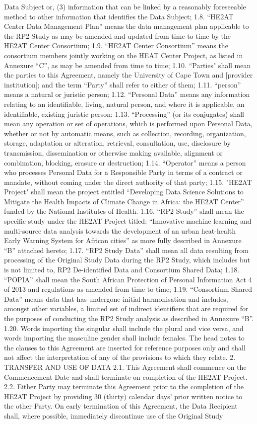 \documentclass[12pt,letterpaper]{article}
\begin{document}
Data Subject or, (3) information that can be linked by a reasonably foreseeable method to other information that identifies the Data Subject;   1.8.	“HE2AT Center Data Management Plan” means the data management plan applicable to the RP2 Study as may be amended and updated from time to time by the HE2AT Center Consortium; 1.9.	“HE2AT Center Consortium” means the consortium members jointly working on the HEAT Center Project, as listed in Annexure “C”, as may be amended from time to time; 1.10.	“Parties" shall mean the parties to this Agreement, namely the University of Cape Town and [provider institution]; and the term “Party” shall refer to either of them; 1.11.	“person” means a natural or juristic person; 1.12.	“Personal Data” means any information relating to an identifiable, living, natural person, and where it is applicable, an identifiable, existing juristic person;	 1.13.	“Processing” (or its conjugates) shall mean any operation or set of operations, which is performed upon Personal Data, whether or not by automatic means, such as collection, recording, organization, storage, adaptation or alteration, retrieval, consultation, use, disclosure by transmission, dissemination or otherwise making available, alignment or combination, blocking, erasure or destruction; 1.14.	“Operator” means a person who processes Personal Data for a Responsible Party in terms of a contract or mandate, without coming under the direct authority of that party; 1.15.	"HE2AT Project" shall mean the project entitled “Developing Data Science Solutions to Mitigate the Health Impacts of Climate Change in Africa: the HE2AT Center” funded by the National Institutes of Health. 1.16.	“RP2 Study” shall mean the specific study under the HE2AT Project titled: “Innovative machine learning and multi-source data analysis towards the development of an urban heat-health Early Warning System for African cities” as more fully described in Annexure “B” attached hereto; 1.17.	“RP2 Study Data” shall mean all data resulting from processing of the Original Study Data during the RP2 Study, which includes but is not limited to, RP2 De-identified Data and Consortium Shared Data; 1.18.	“POPIA” shall mean the South African Protection of Personal Information Act 4 of 2013 and regulations as amended from time to time; 1.19.	“Consortium Shared Data” means data that has undergone initial harmonisation and includes, amongst other variables, a limited set of indirect identifiers that are required for the purposes of conducting the RP2 Study analysis as described in Annexure “B”.  1.20.	Words importing the singular shall include the plural and vice versa, and words importing the masculine gender shall include females. The head notes to the clauses to this Agreement are inserted for reference purposes only and shall not affect the interpretation of any of the provisions to which they relate. 2.	TRANSFER AND USE OF DATA 2.1.	This Agreement shall commence on the Commencement Date and shall terminate on completion of the HE2AT Project. 2.2.	Either Party may terminate this Agreement prior to the completion of the HE2AT Project by providing 30 (thirty) calendar days’ prior written notice to the other Party. On early termination of this Agreement, the Data Recipient shall, where possible, immediately discontinue use of the Original Study 
\end{document}
